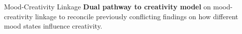 \documentclass[pdf]{beamer}
\begin{document}


\begin{frame}{Mood-Creativity Linkage}
\textbf{Dual pathway to creativity model} on mood-creativity linkage to reconcile previously conflicting findings on how different mood states influence creativity.
\end{frame}
\end{document}
